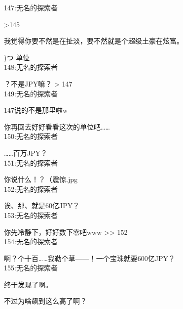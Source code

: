147:无名的探索者

>145

我觉得你要不然是在扯淡，要不然就是个超级土豪在炫富。

)つ {单位}\\

148:无名的探索者

？不是JPY嘛？ > 147\\

149:无名的探索者

147说的不是那里啦w

你再回去好好看看这次的单位吧……\\

150:无名的探索者

……百万JPY？\\

151:无名的探索者

你说什么！？（震惊.jpg\\

152:无名的探索者

诶、那、就是60亿JPY？\\

153:无名的探索者

你先冷静下，好好数下零吧www >> 152\\

154:无名的探索者

啊？个十百……我勒个草——！一个宝珠就要600亿JPY？\\

155:无名的探索者

终于发现了啊。

不过为啥飙到这么高了啊？\\

